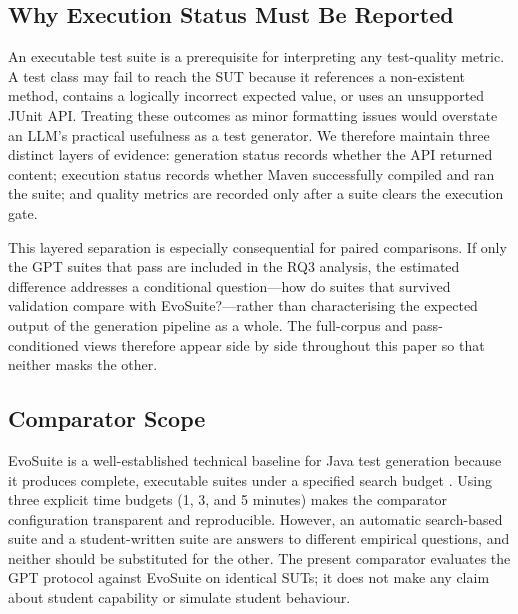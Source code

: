 \subsection{Why Execution Status Must Be Reported}

An executable test suite is a prerequisite for interpreting any test-quality metric. A test class may fail to reach the SUT because it references a non-existent method, contains a logically incorrect expected value, or uses an unsupported JUnit API. Treating these outcomes as minor formatting issues would overstate an LLM's practical usefulness as a test generator. We therefore maintain three distinct layers of evidence: generation status records whether the API returned content; execution status records whether Maven successfully compiled and ran the suite; and quality metrics are recorded only after a suite clears the execution gate.

This layered separation is especially consequential for paired comparisons. If only the GPT suites that pass are included in the RQ3 analysis, the estimated difference addresses a conditional question---how do suites that survived validation compare with EvoSuite?---rather than characterising the expected output of the generation pipeline as a whole. The full-corpus and pass-conditioned views therefore appear side by side throughout this paper so that neither masks the other.

\subsection{Comparator Scope}

EvoSuite is a well-established technical baseline for Java test generation because it produces complete, executable suites under a specified search budget \cite{Lemieux_2023}. Using three explicit time budgets (1, 3, and 5 minutes) makes the comparator configuration transparent and reproducible. However, an automatic search-based suite and a student-written suite are answers to different empirical questions, and neither should be substituted for the other. The present comparator evaluates the GPT protocol against EvoSuite on identical SUTs; it does not make any claim about student capability or simulate student behaviour.
